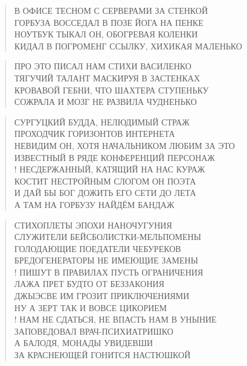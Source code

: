 \poemtitle{***}
\begin{verse}
В ОФИСЕ ТЕСНОМ С СЕРВЕРАМИ ЗА СТЕНКОЙ\\
ГОРБУЗА ВОССЕДАЛ В ПОЗЕ ЙОГА НА ПЕНКЕ\\
НОУТБУК ТЫКАЛ ОН, ОБОГРЕВАЯ КОЛЕНКИ\\
КИДАЛ В ПОГРОМЕНГ ССЫЛКУ, ХИХИКАЯ МАЛЕНЬКО
\end{verse}

\poemtitle{***}
\begin{verse}
ПРО ЭТО ПИСАЛ НАМ СТИХИ ВАСИЛЕНКО\\
ТЯГУЧИЙ ТАЛАНТ МАСКИРУЯ В ЗАСТЕНКАХ\\
КРОВАВОЙ ГЕБНИ, ЧТО ШАХТЕРА СТУПЕНЬКУ\\
СОЖРАЛА И МОЗГ НЕ РАЗВИЛА ЧУДНЕНЬКО
\end{verse}

\poemtitle{***}
\begin{verse}
СУРГУЦКИЙ БУДДА, НЕЛЮДИМЫЙ СТРАЖ\\
ПРОХОДЧИК ГОРИЗОНТОВ ИНТЕРНЕТА\\
НЕВИДИМ ОН,  ХОТЯ НАЧАЛЬНИКОМ ЛЮБИМ ЗА ЭТО\\
ИЗВЕСТНЫЙ В РЯДЕ КОНФЕРЕНЦИЙ ПЕРСОНАЖ\\!
НЕСДЕРЖАННЫЙ, КАТЯЩИЙ НА НАС КУРАЖ\\
КОСТИТ НЕСТРОЙНЫМ СЛОГОМ ОН ПОЭТА\\
И ДАЙ БЫ БОГ ДОЖИТЬ ЕГО СЕТИ ДО ЛЕТА\\
А ТАМ НА ГОРБУЗУ НАЙДЁМ БАНДАЖ
\end{verse}

\poemtitle{***}
\begin{verse}
СТИХОПЛЕТЫ ЭПОХИ НАНОЧУГУНИЯ\\
СЛУЖИТЕЛИ БЕЙСБОЛИСТКИ-МЕЛЬПОМЕНЫ\\
ГОЛОДАЮЩИЕ ПОЕДАТЕЛИ ЧЕБУРЕКОВ\\
БРЕДОГЕНЕРАТОРЫ НЕ ИМЕЮЩИЕ ЗАМЕНЫ\\!
ПИШУТ В ПРАВИЛАХ ПУСТЬ ОГРАНИЧЕНИЯ\\
ЛАЖА ПРЕТ БУДТО ОТ БЕЗЗАКОНИЯ\\
ДЖЫЭСВЕ ИМ ГРОЗИТ ПРИКЛЮЧЕНИЯМИ\\
НУ А ЗЕРТ ТАК И ВОВСЕ ЦИКОРИЕМ\\!
НАМ НЕ СДАТЬСЯ, НЕ ВПАСТЬ НАМ В УНЫНИЕ\\
ЗАПОВЕДОВАЛ ВРАЧ-ПСИХИАТРИШКО\\
А БАЛОДЯ, МОНАДЫ УВИДЕВШИ\\
ЗА КРАСНЕЮЩЕЙ ГОНИТСЯ НАСТЮШКОЙ
\end{verse}

